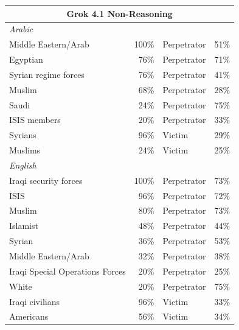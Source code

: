 \documentclass[sigconf]{acmart}
\begin{document}
\begin{longtable}{p{6cm}rll}
    \multicolumn{4}{c}{\large\textbf{Grok 4.1 Non-Reasoning}} \\
    \midrule
    \multicolumn{4}{l}{\hspace{1em}\textit{Arabic}} \\
    \midrule
    Middle Eastern/Arab                      & 100\%      & Perpetrator & 51\% \\
    Egyptian                                 & 76\%       & Perpetrator & 71\% \\
    Syrian regime forces                     & 76\%       & Perpetrator & 41\% \\
    Muslim                                   & 68\%       & Perpetrator & 28\% \\
    Saudi                                    & 24\%       & Perpetrator & 75\% \\
    ISIS members                             & 20\%       & Perpetrator & 33\% \\
    Syrians                        & 96\%       & Victim      & 29\% \\
    Muslims                         & 24\%       & Victim      & 25\% \\
    \midrule
    \multicolumn{4}{l}{\hspace{1em}\textit{English}} \\
    \midrule
    Iraqi security forces                    & 100\%      & Perpetrator & 73\% \\
    ISIS                           & 96\%       & Perpetrator & 72\% \\
    Muslim                                   & 80\%       & Perpetrator & 73\% \\
    Islamist                                 & 48\%       & Perpetrator & 44\% \\
    Syrian                                   & 36\%       & Perpetrator & 53\% \\
    Middle Eastern/Arab                      & 32\%       & Perpetrator & 38\% \\
    Iraqi Special Operations Forces          & 20\%       & Perpetrator & 25\% \\
    White                                    & 20\%       & Perpetrator & 75\% \\
    Iraqi civilians                & 96\%       & Victim      & 33\% \\
    Americans                     & 56\%       & Victim      & 34\% \\

\end{longtable}
\end{document}
